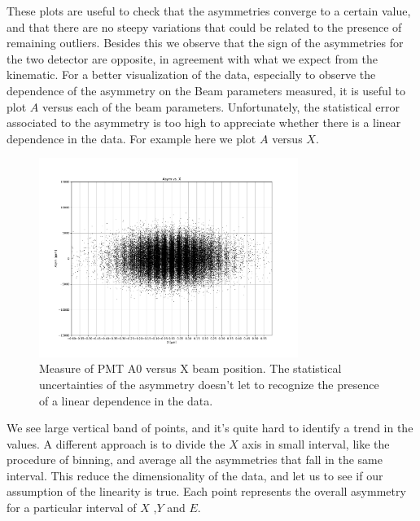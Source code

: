 These plots are useful to check that the asymmetries converge to a certain value, and that there are no steepy variations that could be related to the presence of remaining outliers. Besides this we observe that the sign of the asymmetries for the two detector are opposite, in agreement with what we expect from the kinematic.
For a better visualization of the data, especially to observe the dependence of the asymmetry on the Beam parameters measured, it is useful to plot $A$ versus each of the beam parameters. Unfortunately, the statistical error associated to the asymmetry is too high to appreciate whether there is a linear dependence in the data. For example here we plot $A$ versus $X$.

\begin{figure}[hbtp]
\centering
\includegraphics[width = 0.75\textwidth]{Analysis/Fit/A_vs_X.pdf}
\caption{Measure of PMT A0 versus X beam position. The statistical uncertainties of the asymmetry doesn't let to recognize the presence of a linear dependence in the data.}
\end{figure}

We see large vertical band of points, and it's quite hard to identify a trend in the values. A different approach is to divide the $X$ axis in small interval, like the procedure of binning, and average all the asymmetries that fall in the same interval. This reduce the dimensionality of the data, and let us to see if our assumption of the linearity is true. Each point represents the overall asymmetry for a particular interval of $X$ ,$Y$ and $E$. 

